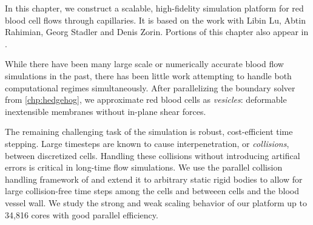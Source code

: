 In this chapter, we construct a scalable, high-fidelity simulation platform for red blood cell flows through capillaries.
It is based on the work \cite{lu2019scalable} with Libin Lu, Abtin Rahimian, Georg Stadler and Denis Zorin.
Portions of this chapter also appear in \cite{lu2019parallel}.

While there have been many large scale or numerically accurate blood flow simulations in the past, there has been little work attempting to handle both computational regimes simultaneously.
After parallelizing the boundary solver from \cref{chp:hedgehog}, we approximate red blood cells as \textit{vesicles}: deformable inextensible membranes without in-plane shear forces.

The remaining challenging task of the simulation is robust, cost-efficient time stepping.
Large timesteps are known to cause interpenetration, or \textit{collisions}, between discretized cells.
Handling these collisions without introducing artifical errors is critical in long-time flow simulations.
We use the parallel collision handling framework of \cite{lu2018parallel} and extend it to arbitrary static rigid bodies to allow for large collision-free time steps among the cells and betweeen cells and the blood vessel wall.
We study the strong and weak scaling behavior of our platform up to 34,816 cores with good parallel efficiency.







